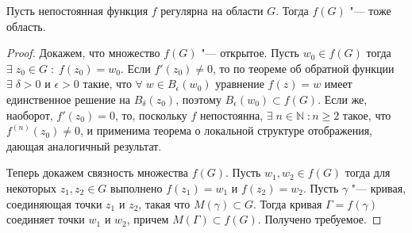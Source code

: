 \begin{theorem}
	Пусть непостоянная функция $f$ регулярна на области $G$. Тогда $f(G)$ "--- тоже область.
\end{theorem}

\begin{proof}
	Докажем, что множество $f(G)$ "--- открытое. Пусть $w_0 \in f(G)$ тогда \\ $\exists \; z_0 \in G \; : \; f(z_0) = w_0$. Если $f'(z_0) \ne 0$, то по теореме об обратной функции $\exists \; \delta > 0$ и $\epsilon > 0$ такие, что  $\forall \; w \in B_\epsilon(w_0)$ уравнение $f(z) = w$ имеет единственное решение на $B_\delta(z_0)$, поэтому $B_\epsilon(w_0) \subset f(G)$. Если же, наоборот, $f'(z_0) = 0$, то, поскольку $f$ непостоянна, $ \exists \; n \in \mathbb{N} \; : n \ge 2$ такое, что $f^{(n)}(z_0) \ne 0$, и применима теорема о локальной структуре отображения, дающая аналогичный результат.
	
	Теперь докажем связность множества $f(G)$. Пусть $w_1, w_2 \in f(G)$ тогда для некоторых $z_1, z_2 \in G$ выполнено $f(z_1) = w_1$ и $f(z_2) = w_2$. Пусть $\gamma$ "--- кривая, соединяющая точки $z_1$ и $z_2$, такая что $M(\gamma) \subset G$. Тогда кривая $\Gamma = f(\gamma)$ соединяет точки $w_1$ и $w_2$, причем $M(\Gamma) \subset f(G)$. Получено требуемое.
\end{proof}
